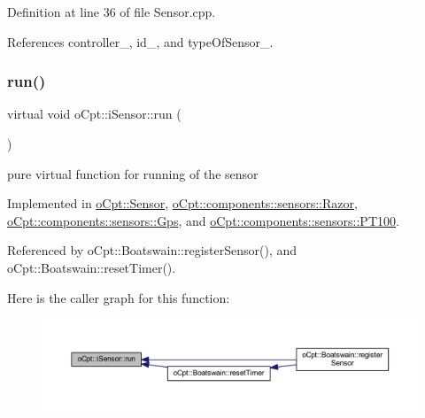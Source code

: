 Definition at line 36 of file Sensor.\+cpp.



References controller\+\_\+, id\+\_\+, and type\+Of\+Sensor\+\_\+.

\hypertarget{classo_cpt_1_1i_sensor_abbface05a16b17354c23389d9747bf7c}{}\label{classo_cpt_1_1i_sensor_abbface05a16b17354c23389d9747bf7c} 
\subsubsection{\texorpdfstring{run()}{run()}}
{\footnotesize\ttfamily virtual void o\+Cpt\+::i\+Sensor\+::run (\begin{DoxyParamCaption}{ }\end{DoxyParamCaption})\hspace{0.3cm}{\ttfamily [pure virtual]}}

pure virtual function for running of the sensor 

Implemented in \hyperlink{classo_cpt_1_1_sensor_aef25b0e5f3a8358ee81c97c73909fbe6}{o\+Cpt\+::\+Sensor}, \hyperlink{classo_cpt_1_1components_1_1sensors_1_1_razor_ad93891ffb2d47e56d1417f0a40026c6e}{o\+Cpt\+::components\+::sensors\+::\+Razor}, \hyperlink{classo_cpt_1_1components_1_1sensors_1_1_gps_af703c48b8b7220a1909570f46edae932}{o\+Cpt\+::components\+::sensors\+::\+Gps}, and \hyperlink{classo_cpt_1_1components_1_1sensors_1_1_p_t100_a41dfc55a4be7993949feeb5ac013690d}{o\+Cpt\+::components\+::sensors\+::\+P\+T100}.



Referenced by o\+Cpt\+::\+Boatswain\+::register\+Sensor(), and o\+Cpt\+::\+Boatswain\+::reset\+Timer().

Here is the caller graph for this function\+:\nopagebreak
\begin{figure}[H]
\begin{center}
\leavevmode
\includegraphics[width=350pt]{classo_cpt_1_1i_sensor_abbface05a16b17354c23389d9747bf7c_icgraph}
\end{center}
\end{figure}
\hypertarget{classo_cpt_1_1i_sensor_a2dec47e27c1e0843a1f874e28a522abd}{}\label{classo_cpt_1_1i_sensor_a2dec47e27c1e0843a1f874e28a522abd} 
